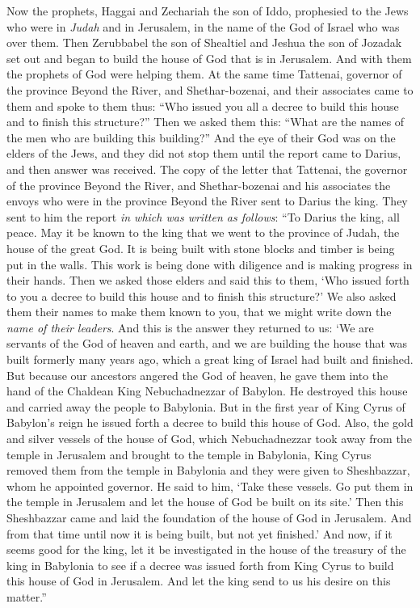 \begin{biblechapter} %
 Now the prophets, Haggai and Zechariah the son of Iddo, prophesied to the Jews who were in \textit{Judah} and in Jerusalem, in the name of the God of Israel who was over them.
\verse Then Zerubbabel the son of Shealtiel and Jeshua the son of Jozadak set out and began to build the house of God that is in Jerusalem. And with them the prophets of God were helping them.
\verse At the same time Tattenai, governor of the province Beyond the River, and Shethar-bozenai, and their associates came to them and spoke to them thus: “Who issued you all a decree to build this house and to finish this structure?”
\verse Then we asked them this: “What are the names of the men who are building this building?”
\verse And the eye of their God was on the elders of the Jews, and they did not stop them until the report came to Darius, and then answer was received.
\verse The copy of the letter that Tattenai, the governor of the province Beyond the River, and Shethar-bozenai and his associates the envoys who were in the province Beyond the River sent to Darius the king.
\verse They sent to him the report \textit{in which was written as follows}: “To Darius the king, all peace.
\verse May it be known to the king that we went to the province of Judah, the house of the great God. It is being built with stone blocks and timber is being put in the walls. This work is being done with diligence and is making progress in their hands.
\verse Then we asked those elders and said this to them, ‘Who issued forth to you a decree to build this house and to finish this structure?’
\verse We also asked them their names to make them known to you, that we might write down the \textit{name of their leaders}.
\verse And this is the answer they returned to us: ‘We are servants of the God of heaven and earth, and we are building the house that was built formerly many years ago, which a great king of Israel had built and finished.
\verse But because our ancestors angered the God of heaven, he gave them into the hand of the Chaldean King Nebuchadnezzar of Babylon. He destroyed this house and carried away the people to Babylonia.
\verse But in the first year of King Cyrus of Babylon’s reign he issued forth a decree to build this house of God.
\verse Also, the gold and silver vessels of the house of God, which Nebuchadnezzar took away from the temple in Jerusalem and brought to the temple in Babylonia, King Cyrus removed them from the temple in Babylonia and they were given to Sheshbazzar, whom he appointed governor.
\verse He said to him, ‘Take these vessels. Go put them in the temple in Jerusalem and let the house of God be built on its site.’
\verse Then this Sheshbazzar came and laid the foundation of the house of God in Jerusalem. And from that time until now it is being built, but not yet finished.’
\verse And now, if it seems good for the king, let it be investigated in the house of the treasury of the king in Babylonia to see if a decree was issued forth from King Cyrus to build this house of God in Jerusalem. And let the king send to us his desire on this matter.”
\end{biblechapter}

